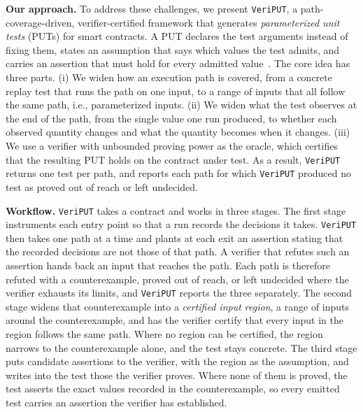 \documentclass[manuscript,anonymous]{acmart}
\newcommand{\tool}[1]{\texttt{#1}}
\begin{document}
\textbf{Our approach.} To address these challenges, we present \tool{VeriPUT}, a
path-coverage-driven, verifier-certified framework that generates
\emph{parameterized unit tests} (PUTs) for smart contracts. A PUT declares the
test arguments instead of fixing them, states an assumption that says which
values the test admits, and carries an assertion that must hold for every
admitted value~\cite{Tillmann2005}. The core idea has three parts. (i) We
widen how an execution path is covered, from a concrete replay test that runs
the path on one input, to a range of inputs that all follow the same path, i.e.,
parameterized inputs. (ii) We widen what the test observes at the end of the
path, from the single value one run produced, to whether each observed quantity
changes and what the quantity becomes when it changes. (iii) We use a verifier
with unbounded proving power as the oracle, which certifies that the resulting
PUT holds on the contract under test. As a result, \tool{VeriPUT} returns one test per path, and reports each path for which \tool{VeriPUT}
produced no test as proved out of reach or left undecided.

\textbf{Workflow.} \tool{VeriPUT} takes a contract and works in three stages.
The first stage instruments each entry point so that a run records the decisions
it takes. \tool{VeriPUT} then takes one path at a time and plants at each exit
an assertion stating that the recorded decisions are not those of that path. A
verifier that refutes such an assertion hands back an input that reaches the
path. Each path is therefore refuted with a counterexample, proved out of reach,
or left undecided where the verifier exhausts its limits, and \tool{VeriPUT}
reports the three separately. The second stage widens that counterexample into a
\emph{certified input region}, a range of inputs around the counterexample, and
has the verifier certify that every input in the region follows the same path.
Where no region can be certified, the region narrows to the counterexample
alone, and the test stays concrete. The third stage puts candidate assertions to
the verifier, with the region as the assumption, and writes into the test those
the verifier proves. Where none of them is proved, the test asserts the exact
values recorded in the counterexample, so every emitted test carries an
assertion the verifier has established.
\end{document}
